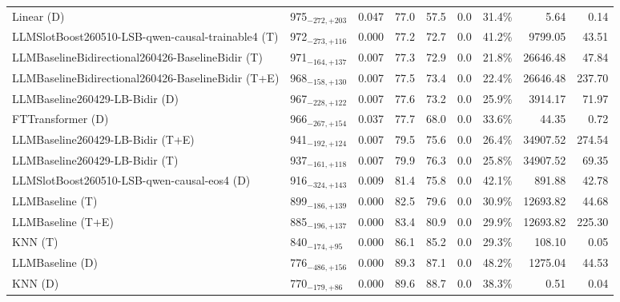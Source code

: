 \begin{tabular}{llcccccrr}
Linear (D) & 975${}_{-272,+203}$ & 0.047 & 77.0 & 57.5 & 0.0 & 31.4\% & 5.64 & 0.14 \\
LLMSlotBoost260510-LSB-qwen-causal-trainable4 (T) & 972${}_{-273,+116}$ & 0.000 & 77.2 & 72.7 & 0.0 & 41.2\% & 9799.05 & 43.51 \\
LLMBaselineBidirectional260426-BaselineBidir (T) & 971${}_{-164,+137}$ & 0.007 & 77.3 & 72.9 & 0.0 & 21.8\% & 26646.48 & 47.84 \\
LLMBaselineBidirectional260426-BaselineBidir (T+E) & 968${}_{-158,+130}$ & 0.007 & 77.5 & 73.4 & 0.0 & 22.4\% & 26646.48 & 237.70 \\
LLMBaseline260429-LB-Bidir (D) & 967${}_{-228,+122}$ & 0.007 & 77.6 & 73.2 & 0.0 & 25.9\% & 3914.17 & 71.97 \\
FTTransformer (D) & 966${}_{-267,+154}$ & 0.037 & 77.7 & 68.0 & 0.0 & 33.6\% & 44.35 & 0.72 \\
LLMBaseline260429-LB-Bidir (T+E) & 941${}_{-192,+124}$ & 0.007 & 79.5 & 75.6 & 0.0 & 26.4\% & 34907.52 & 274.54 \\
LLMBaseline260429-LB-Bidir (T) & 937${}_{-161,+118}$ & 0.007 & 79.9 & 76.3 & 0.0 & 25.8\% & 34907.52 & 69.35 \\
LLMSlotBoost260510-LSB-qwen-causal-eos4 (D) & 916${}_{-324,+143}$ & 0.009 & 81.4 & 75.8 & 0.0 & 42.1\% & 891.88 & 42.78 \\
LLMBaseline (T) & 899${}_{-186,+139}$ & 0.000 & 82.5 & 79.6 & 0.0 & 30.9\% & 12693.82 & 44.68 \\
LLMBaseline (T+E) & 885${}_{-196,+137}$ & 0.000 & 83.4 & 80.9 & 0.0 & 29.9\% & 12693.82 & 225.30 \\
KNN (T) & 840${}_{-174,+95}$ & 0.000 & 86.1 & 85.2 & 0.0 & 29.3\% & 108.10 & 0.05 \\
LLMBaseline (D) & 776${}_{-486,+156}$ & 0.000 & 89.3 & 87.1 & 0.0 & 48.2\% & 1275.04 & 44.53 \\
KNN (D) & 770${}_{-179,+86}$ & 0.000 & 89.6 & 88.7 & 0.0 & 38.3\% & 0.51 & 0.04 \\
\bottomrule
\end{tabular}